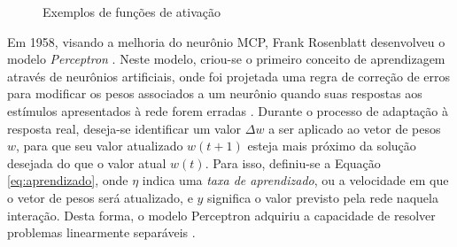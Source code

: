 \begin{figure}[h!]
     \hfill
     \hfill
     \hfill
     \caption{Exemplos de funções de ativação \cite{goodfellow}}
     \label{fig:activation}
\end{figure}


Em 1958, visando a melhoria do neurônio MCP, Frank Rosenblatt desenvolveu o modelo \emph{Perceptron} \cite{Rosenblatt}. Neste modelo, criou-se o primeiro conceito de aprendizagem através de neurônios artificiais, onde foi projetada uma regra de correção de erros para modificar os pesos associados a um neurônio quando suas respostas aos estímulos apresentados à rede forem erradas \cite{arbib}. Durante o processo de adaptação à resposta real, deseja-se identificar um valor $\Delta w$ a ser aplicado ao vetor de pesos $w$, para que seu valor atualizado $w(t+1)$ esteja mais próximo da solução desejada do que o valor atual $w(t)$. Para isso, definiu-se a Equação \ref{eq:aprendizado}, onde $\eta$ indica uma \emph{taxa de aprendizado}, ou a velocidade em que o vetor de pesos será atualizado, e $\hat{y}$ significa o valor previsto pela rede naquela interação. Desta forma, o modelo Perceptron adquiriu a capacidade de resolver problemas linearmente separáveis \cite{braga}.

